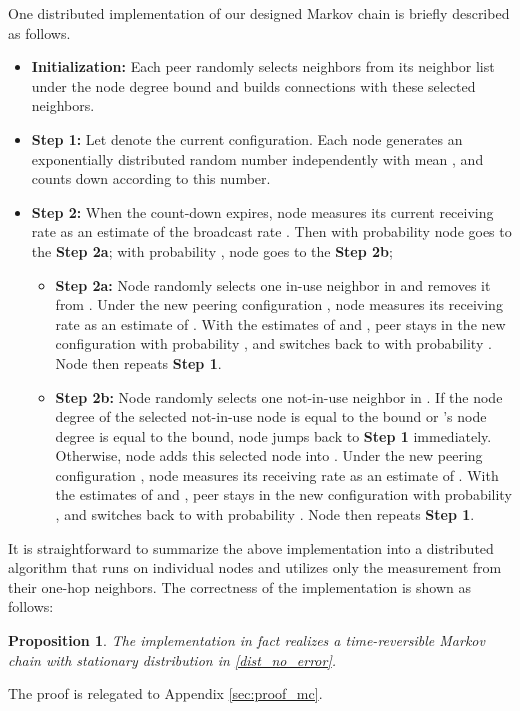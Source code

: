 \documentclass[10pt,conference]{IEEEtran}
\newtheorem{proposition}{\bf Proposition}
\begin{document}
One distributed implementation of our designed Markov chain is briefly
described as follows.
\begin{itemize}
\item \textbf{Initialization:} Each peer  randomly selects
neighbors from its neighbor list  under the node degree bound and builds connections with these selected neighbors.
\item \textbf{Step 1:} Let  denote the current configuration. Each node
 generates an exponentially distributed random number independently
with mean ,
and counts down according to this number.
\item \textbf{Step 2:} When the count-down expires, node  measures its
current receiving rate as an estimate of the broadcast rate .
Then with probability  node  goes to the \textbf{Step 2a};
with probability , node  goes to the \textbf{Step 2b};
    \begin{itemize}
        \item \textbf{Step 2a:} Node  randomly selects one in-use neighbor
        in  and removes it from . Under the new peering
        configuration , node  measures its receiving rate as an estimate of
        . With the estimates of  and , peer  stays in the
        new configuration  with probability , and switches back to  with probability . Node  then repeats \textbf{Step 1}.
        \item \textbf{Step 2b:} Node  randomly selects one not-in-use neighbor
        in . If the node degree of the selected not-in-use node is equal to
        the bound or 's node degree is equal to the bound, node  jumps back to
        \textbf{Step 1} immediately. Otherwise,
        node  adds this selected node into . Under the new peering
        configuration , node  measures its receiving rate as an estimate of
        . With the estimates of  and , peer  stays in the
        new configuration  with probability , and switches back to  with probability . Node  then repeats \textbf{Step 1}.
    \end{itemize}
\end{itemize}

It is straightforward to summarize the above implementation into a distributed algorithm that runs on individual nodes and utilizes only the measurement from their one-hop neighbors. The correctness of the implementation is shown as follows:
\begin{proposition}
\label{implement_mc} The implementation in fact realizes a time-reversible
Markov chain with stationary distribution in \eqref{dist_no_error}.
\end{proposition}
The proof is relegated to Appendix \ref{sec:proof_mc}.
\end{document}
